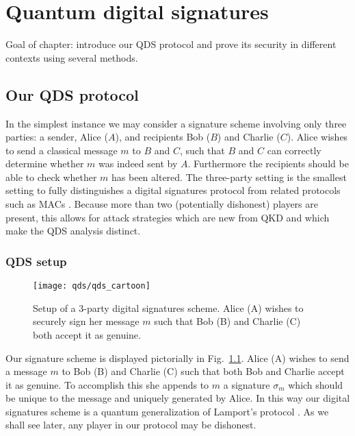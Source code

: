 \chapter{Quantum digital signatures}
Goal of chapter: introduce our QDS protocol and prove its security in different contexts using several methods.


\section{Our QDS protocol}\label{sec:qds_protocol}

In the simplest instance we may consider a signature scheme involving only three parties: a sender, Alice ($A$), and recipients Bob ($B$) and Charlie ($C$). Alice wishes to send a classical message $m$ to $B$ and $C$, such that $B$ and $C$ can correctly determine whether $m$ was indeed sent by $A$. Furthermore the recipients should be able to check whether $m$ has been altered. The three-party setting is the smallest setting to fully distinguishes a digital signatures protocol from related protocols such as MACs \cite{Schneier2006}. Because more than two (potentially dishonest) players are present, this allows for attack strategies which are new from QKD and which make the QDS analysis distinct.

\subsection{QDS setup}

\begin{figure}[htp]
\centering
\texttt{[image: qds/qds\_cartoon]}
\caption{\label{fig:qds_cartoon} Setup of a $3$-party digital signatures scheme. Alice (A) wishes to securely sign her message $m$ such that Bob (B) and Charlie (C) both accept it as genuine.}
\end{figure}

Our signature scheme is displayed pictorially in Fig.~\ref{fig:qds_cartoon}. Alice (A) wishes to send a message $m$ to Bob (B) and Charlie (C) such that both Bob and Charlie accept it as genuine. To accomplish this she appends to $m$ a signature $\sigma_m$ which should be unique to the message and uniquely generated by Alice. In this way our digital signatures scheme is a quantum generalization of Lamport's protocol . As we shall see later, any player in our protocol may be dishonest.

